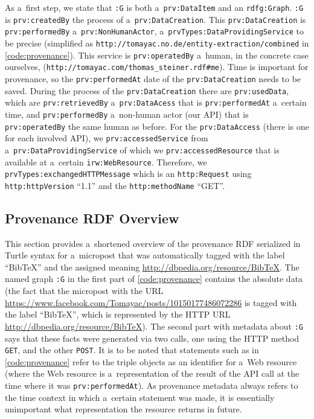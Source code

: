 As a~first step, we state that \texttt{:G} is both a~\texttt{prv:DataItem}
and an \texttt{rdfg:Graph}.
\texttt{:G} is \texttt{prv:createdBy} the process of
a~\texttt{prv:DataCreation}.
This \texttt{prv:DataCreation} is \texttt{prv:performedBy}
a~\texttt{prv:NonHumanActor},
a~\texttt{prvTypes:DataProvidingService}
to be precise (simplified as
\texttt{http://tomayac.no.de/entity-extraction/combined}
in \autoref{code:provenance}).
This service is \texttt{prv:operatedBy} a~human,
in the concrete case ourselves,
(\texttt{http://tomayac.com/thomas\_steiner.rdf\#me}).
Time is important for provenance,
so the \texttt{prv:performedAt} date of
the \texttt{prv:DataCreation}
needs to be saved.
During the process of the \texttt{prv:DataCreation}
there are \texttt{prv:usedData},
which are \texttt{prv:retrievedBy} a~\texttt{prv:DataAcess}
that is \texttt{prv:performedAt} a~certain time,
and \texttt{prv:performedBy} a~non-human actor
(our API) that is \texttt{prv:operatedBy}
the same human as before.
For the \texttt{prv:DataAccess}
(there is one for each involved API),
we \texttt{prv:accessedService} from
a~\texttt{prv:DataProvidingService} of which we
\texttt{prv:accessedResource} that is available at
a~certain \texttt{irw:WebResource}.
Therefore, we \texttt{prvTypes:exchangedHTTPMessage} which is an
\texttt{http:Request} using \texttt{http:httpVersion} ``1.1''
and the \texttt{http:methodName} ``GET''.

\subsection{Provenance RDF Overview}

This section provides a~shortened overview of the provenance RDF
serialized in Turtle syntax for a~micropost that was automatically
tagged with the label ``BibTeX''
and the assigned meaning
\url{http://dbpedia.org/resource/BibTeX}.
The named graph \texttt{:G} in the first part
of \autoref{code:provenance}
contains the absolute data (the fact that the micropost with
the URL
\url{https://www.facebook.com/Tomayac/posts/10150177486072286}
is tagged with the label ``BibTeX'', which is represented by
the HTTP URL \url{http://dbpedia.org/resource/BibTeX}).
The second part with metadata about \texttt{:G} says that
these facts were generated via two calls,
one using the HTTP method \texttt{GET},
and the other \texttt{POST}.
It is to be noted that statements
such as in \autoref{code:provenance} 
refer to the triple objects as an identifier for a~Web resource
(where the Web resource is a~representation of the result of the
API call at the time where it was \texttt{prv:performedAt}).
As provenance metadata always refers to the time context
in which a~certain statement was made,
it is essentially unimportant
what representation the resource returns in future.

